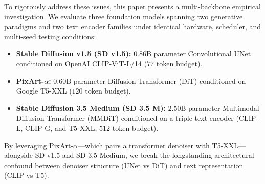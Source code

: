 \documentclass[10pt,twocolumn,letterpaper]{article}
\begin{document}
To rigorously address these issues, this paper presents a multi-backbone empirical investigation. We evaluate three foundation models spanning two generative paradigms and two text encoder families under identical hardware, scheduler, and multi-seed testing conditions:
\begin{itemize}
    \item \textbf{Stable Diffusion v1.5 (SD v1.5):} $0.86\text{B}$ parameter Convolutional UNet conditioned on OpenAI CLIP-ViT-L/14 ($77$ token budget).
    \item \textbf{PixArt-$\alpha$:} $0.60\text{B}$ parameter Diffusion Transformer (DiT) conditioned on Google T5-XXL ($120$ token budget).
    \item \textbf{Stable Diffusion 3.5 Medium (SD 3.5 M):} $2.50\text{B}$ parameter Multimodal Diffusion Transformer (MMDiT) conditioned on a triple text encoder (CLIP-L, CLIP-G, and T5-XXL, $512$ token budget).
\end{itemize}

By leveraging PixArt-$\alpha$---which pairs a transformer denoiser with T5-XXL---alongside SD v1.5 and SD 3.5 Medium, we break the longstanding architectural confound between denoiser structure (UNet vs DiT) and text representation (CLIP vs T5).
\end{document}
